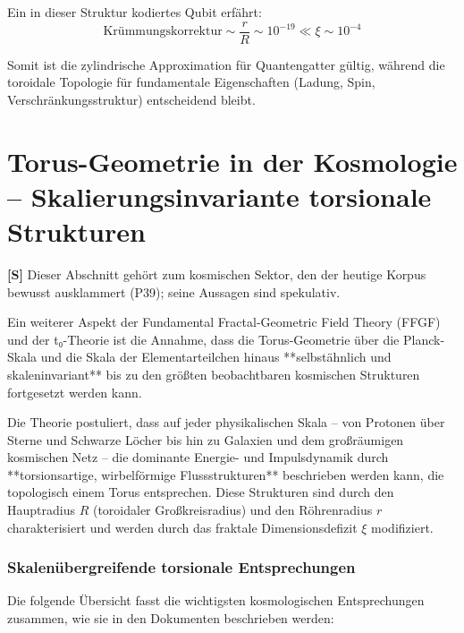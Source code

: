 	Ein in dieser Struktur kodiertes Qubit erfährt:
	\[
	\text{Krümmungskorrektur} \sim \frac{r}{R} \sim 10^{-19} 
	\ll \xi \sim 10^{-4}
	\]
	
	Somit ist die zylindrische Approximation für Quantengatter gültig, während die toroidale Topologie für fundamentale Eigenschaften (Ladung, Spin, Verschränkungsstruktur) entscheidend bleibt.
	\section{Torus-Geometrie in der Kosmologie – Skalierungsinvariante torsionale Strukturen}
	
	\textbf{[S]} Dieser Abschnitt gehört zum kosmischen Sektor, den der heutige Korpus bewusst ausklammert (P39); seine Aussagen sind spekulativ.
	
	Ein weiterer Aspekt der Fundamental Fractal-Geometric Field Theory (FFGF) und der t₀-Theorie ist die Annahme, dass die Torus-Geometrie über die Planck-Skala und die Skala der Elementarteilchen hinaus **selbstähnlich und skaleninvariant** bis zu den größten beobachtbaren kosmischen Strukturen fortgesetzt werden kann.
	
	Die Theorie postuliert, dass auf jeder physikalischen Skala – von Protonen über Sterne und Schwarze Löcher bis hin zu Galaxien und dem großräumigen kosmischen Netz – die dominante Energie- und Impulsdynamik durch **torsionsartige, wirbelförmige Flussstrukturen** beschrieben werden kann, die topologisch einem Torus entsprechen. Diese Strukturen sind durch den Hauptradius $R$ (toroidaler Großkreisradius) und den Röhrenradius $r$ charakterisiert und werden durch das fraktale Dimensionsdefizit $\xi$ modifiziert.
	
	\subsubsection{Skalenübergreifende torsionale Entsprechungen}
	
	Die folgende Übersicht fasst die wichtigsten kosmologischen Entsprechungen zusammen, wie sie in den Dokumenten beschrieben werden:
	
